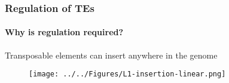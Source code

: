 \documentclass{beamer}
\begin{document}
		\begin{frame} %
			\frametitle{Regulation of TEs}
			\framesubtitle{Why is regulation required?}
			
					
%						
%						
					
						\begin{alertblock}{Transposable elements can insert anywhere in the genome}
					
						\end{alertblock}
						\begin{figure}
							\texttt{[image: ../../Figures/L1-insertion-linear.png]}
						\end{figure}	
						
%					
				
				
		\end{frame}		
	
\end{document}
